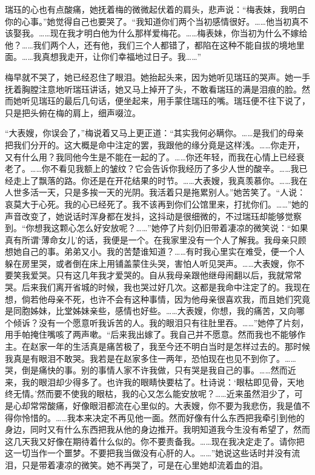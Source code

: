\par 瑞珏的心也有点酸痛，她抚着梅的微微起伏着的肩头，悲声说：“梅表妹，我明白你的心事。”她觉得自己也要哭了。“我知道你们两个当初感情很好。……他当初真不该娶我。……现在我才明白他为什么那样爱梅花。……梅表妹，你当初为什么不嫁给他？……我们两个人，还有他，我们三个人都错了，都陷在这种不能自拔的境地里面。……我真想我走开，让你们幸福地过日子。我……”
\par 梅早就不哭了，她已经忍住了眼泪。她抬起头来，因为她听见瑞珏的哭声。她一手抚着胸膛注意地听瑞珏讲话，她又马上掉开了头，不敢看瑞珏的满是泪痕的脸。然而她听见瑞珏的最后几句话，便坐起来，用手蒙住瑞珏的嘴。瑞珏便不往下说了，只是把头俯在梅的肩上，细声啜泣。
\par “大表嫂，你误会了，”梅说着又马上更正道：“其实我何必瞒你。……是我们的母亲把我们分开的。这大概是命中注定的罢，我跟他的缘分竟是这样浅。……你走开，又有什么用？我同他今生是不能在一起的了。……你还年轻，而我在心情上已经衰老了。……你不看见我额上的皱纹？它会告诉你我经历了多少人世的酸辛。……我已经走上了飘落的路。你还是在开花结果的时节。……大表嫂，我真羡慕你。……我在人世多活一天，只是多挨一天的光阴。我活着只是拖累别人。”她苦笑了。“人说：哀莫大于心死。我的心已经死了。我不该再到你们公馆里来，打扰你们。……”她的声音改变了，她说话时浑身都在发抖，这抖动是很细微的，不过瑞珏却能够觉察到。“你想我这颗心怎么好安放呢？……”她停了片刻仍旧带着凄凉的微笑说：“如果真有所谓‘薄命女儿’的话，我便是一个。在我家里没有一个人了解我。我母亲只顾想她自己的事。弟弟又小。我的苦楚谁知道？……有时我心里实在难受，便一个人躲在房里哭，或者倒在床上用铺盖蒙住头哭，害怕人听见哭声。……大表嫂，你不要笑我爱哭。只有这几年我才爱哭的。自从我母亲跟他继母闹翻以后，我就常常哭。后来我们离开省城的时候，我也哭过好几次。这都是我命中注定了的。我现在想，倘若他母亲不死，也许不会有这种事情，因为他母亲很喜欢我，而且她们究竟是同胞姊妹，比堂姊妹亲些，感情也好些。……大表嫂，你想，我的痛苦，又向哪个倾诉？没有一个愿意听我诉苦的人。我的眼泪只有往肚里吞。……”她停了片刻，用手帕掩住嘴咳了两声嗽。“后来我出嫁了。我自己并不愿意。然而我也不能够作主。在赵家一年的生活真是痛苦极了，我至今还不明白当时是怎样过去的。那时候我真是有眼泪不敢哭。我若是在赵家多住一两年，恐怕现在也见不到你了。……哭，倒是痛快的事。别的事情人家不许我做，只有哭是我自己的事。……然而近来，我的眼泪却少得多了。也许我的眼睛快要枯了。杜诗说：‘眼枯即见骨，天地终无情。’然而要不使我的眼枯，我的心又怎么能安放呢？……近来虽然泪少了，可是心却常常酸痛，好像眼泪都流在心里似的。大表嫂，你不要为我悲伤，我是值不得你怜惜的。……我本来决定不再见他一面。然而好像有什么东西把我牵引到他的身边，同时又有什么东西把我从他的身边推开。我明知道我今生没有希望了，然而这几天我又好像在期待着什么似的。你不要责备我。……现在我决定走了。请你把这一切当作一个噩梦。不要把我当做没有心肝的人。……”她说这些话时并没有流泪，只是带着凄凉的微笑。她不再哭了，可是在心里她却流着血的泪。

